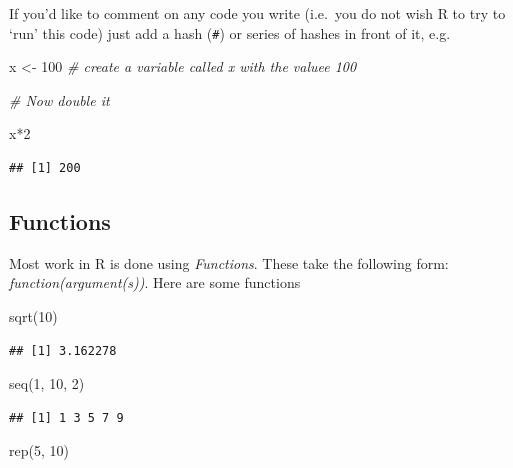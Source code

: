 \documentclass[]{article}
\newenvironment{Shaded}{\begin{snugshade}}{\end{snugshade}}
\newcommand{\CommentTok}[1]{\textcolor[rgb]{0.56,0.35,0.01}{\textit{#1}}}
\newcommand{\DecValTok}[1]{\textcolor[rgb]{0.00,0.00,0.81}{#1}}
\newcommand{\FunctionTok}[1]{\textcolor[rgb]{0.00,0.00,0.00}{#1}}
\newcommand{\NormalTok}[1]{#1}
\newcommand{\OtherTok}[1]{\textcolor[rgb]{0.56,0.35,0.01}{#1}}
\newcommand{\SpecialCharTok}[1]{\textcolor[rgb]{0.00,0.00,0.00}{#1}}
\begin{document}
If you'd like to comment on any code you write (i.e.~you do not wish R
to try to `run' this code) just add a hash (\texttt{\#}) or series of
hashes in front of it, e.g.

\begin{Shaded}
\begin{Highlighting}[]
\NormalTok{x }\OtherTok{\textless{}{-}} \DecValTok{100} \CommentTok{\# create a variable called x with the valuee 100}

\CommentTok{\# Now double it}

\NormalTok{x}\SpecialCharTok{*}\DecValTok{2}
\end{Highlighting}
\end{Shaded}

\begin{verbatim}
## [1] 200
\end{verbatim}

\hypertarget{functions}{%
\subsection{Functions}\label{functions}}

Most work in R is done using \emph{Functions}. These take the following
form: \emph{function(argument(s))}. Here are some functions

\begin{Shaded}
\begin{Highlighting}[]
\FunctionTok{sqrt}\NormalTok{(}\DecValTok{10}\NormalTok{)}
\end{Highlighting}
\end{Shaded}

\begin{verbatim}
## [1] 3.162278
\end{verbatim}

\begin{Shaded}
\begin{Highlighting}[]
\FunctionTok{seq}\NormalTok{(}\DecValTok{1}\NormalTok{, }\DecValTok{10}\NormalTok{, }\DecValTok{2}\NormalTok{)}
\end{Highlighting}
\end{Shaded}

\begin{verbatim}
## [1] 1 3 5 7 9
\end{verbatim}

\begin{Shaded}
\begin{Highlighting}[]
\FunctionTok{rep}\NormalTok{(}\DecValTok{5}\NormalTok{, }\DecValTok{10}\NormalTok{)}
\end{Highlighting}
\end{Shaded}
\end{document}
